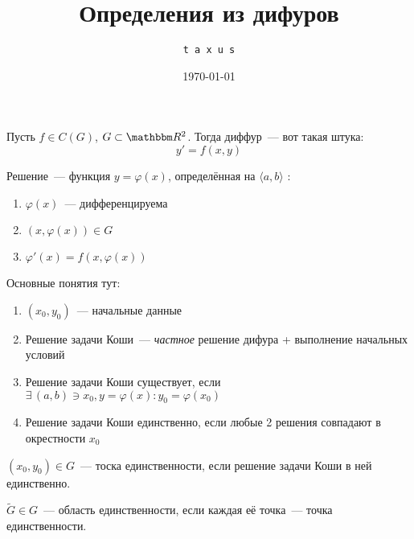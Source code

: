 \documentclass[10pt]{../notes}
\title{Определения из дифуров}
\date{\today}
\author{\texttt{t a x u s}}
\begin{document}
\maketitle

\begin{defn}\label{defn:diffeq}
  Пусть $f \in C(G)$, $G \subset \R^2$. Тогда диффур~--- вот такая штука:
  \[
    y' = f(x, y)
  \]
\end{defn}
\begin{defn}\label{defn:diffsol}
  Решение~--- функция $y=\varphi(x)$, определённая на $\langle a, b \rangle$ :
  \begin{enumerate}
    \item $\varphi(x)$~--- дифференцируема
    \item $(x, \varphi(x)) \in G$
    \item $\varphi'(x) = f(x, \varphi(x))$
  \end{enumerate}
\end{defn}

\begin{defn}\label{defn:cauchyprobl} 
  Основные понятия тут:
  \begin{enumerate}
    \item $(x_0, y_0)$~--- начальные данные
  \item Решение задачи Коши~--- \emph{частное} решение дифура + выполнение начальных условий
    \item Решение задачи Коши существует, если $\exists\, (a,b) \ni x_0,
      y=\varphi(x)\colon y_0 = \varphi(x_0)$
    \item Решение задачи Коши единственно, если любые 2 решения совпадают в окрестности
      $x_0$ 
  \end{enumerate}
\end{defn}

\begin{defn}\label{defn:uniqpnt}
  $(x_0, y_0) \in G$~--- тоска единственности, если решение задачи Коши в ней единственно.
\end{defn}
\begin{defn}\label{defn:uniqset}
  $\tilde{G} \in G$~--- область единственности, если каждая её точка~--- точка
  единственности.
\end{defn}
\end{document}
